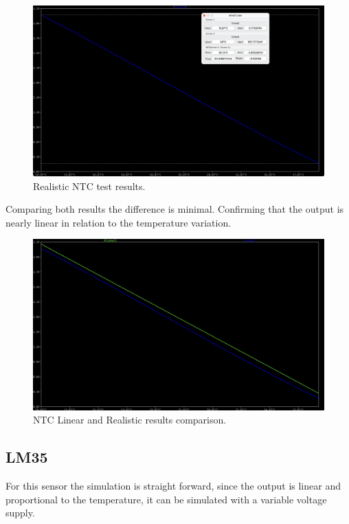 \documentclass[12pt]{article}
\begin{document}
    \begin{figure}[H] 
        \centering
        \includegraphics*[scale = 0.3]{images/NTCRealRes.png}
        \caption{Realistic NTC test results.}
        \label{wrap-fig:1}
    \end{figure}

    Comparing both results the difference is minimal. Confirming that the output is nearly linear in relation to the temperature variation.
    
    \begin{figure}[H] 
        \centering
        \includegraphics*[scale = 0.3]{images/NTCRealLinearComp.png}
        \caption{NTC Linear and Realistic results comparison.}
        \label{wrap-fig:1}
    \end{figure}


\subsection{LM35}

    For this sensor the simulation is straight forward, since the output is linear and proportional to the temperature, 
    it can be simulated with a variable voltage supply. 
    
\end{document}

